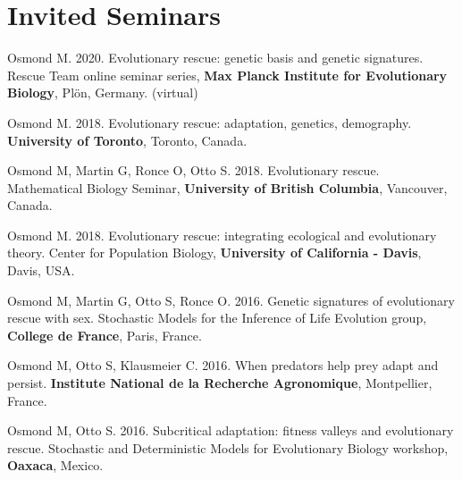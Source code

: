 \documentclass[12pt]{article}
\begin{document}
{%
%

\newpage 
\section*{Invited Seminars}
Osmond M. 2020. Evolutionary rescue: genetic basis and genetic signatures. Rescue Team online seminar series, \textbf{Max Planck Institute for Evolutionary Biology}, Pl\"{o}n, Germany. (virtual)

Osmond M. 2018. Evolutionary rescue: adaptation, genetics, demography. \textbf{University of Toronto}, Toronto, Canada.

Osmond M, Martin G, Ronce O, Otto S. 2018. Evolutionary rescue. Mathematical Biology Seminar, \textbf{University of British Columbia}, Vancouver, Canada.

Osmond M. 2018. Evolutionary rescue: integrating ecological and evolutionary theory. Center for Population Biology, \textbf{University of California - Davis}, Davis, USA. 

Osmond M, Martin G, Otto S, Ronce O. 2016. Genetic signatures of evolutionary rescue with sex. Stochastic Models for the Inference of Life Evolution group, \textbf{College de France}, Paris, France. 

Osmond M, Otto S, Klausmeier C. 2016. When predators help prey adapt and persist. \textbf{Institute National de la Recherche Agronomique}, Montpellier, France. 

Osmond M, Otto S. 2016. Subcritical adaptation: fitness valleys and evolutionary rescue. Stochastic and Deterministic Models for Evolutionary Biology workshop, \textbf{Oaxaca}, Mexico. 


}
\end{document}
